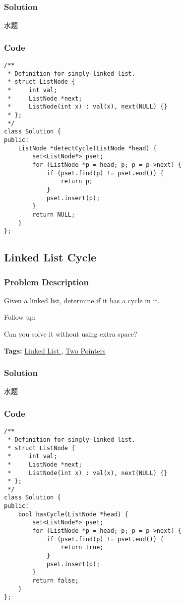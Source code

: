 \documentclass{article}
\begin{document}
\begin{CJK*}{UTF8}{gkai}

\subsubsection*{Solution}
水题

\subsubsection*{Code}
\begin{lstlisting}
/**
 * Definition for singly-linked list.
 * struct ListNode {
 *     int val;
 *     ListNode *next;
 *     ListNode(int x) : val(x), next(NULL) {}
 * };
 */
class Solution {
public:
    ListNode *detectCycle(ListNode *head) {
        set<ListNode*> pset;
        for (ListNode *p = head; p; p = p->next) {
            if (pset.find(p) != pset.end()) {
                return p;
            }
            pset.insert(p);
        }
        return NULL;
    }
}; 
\end{lstlisting}


\subsection{ Linked List Cycle }
\label{ Linked List Cycle }

\subsubsection*{Problem Description}
Given a linked list, determine if it has a cycle in it.

Follow up:


Can you solve it without using extra space?


\textbf{Tags: }
\hyperref[ Linked List ]{ Linked List },  \hyperref[ Two Pointers ]{ Two Pointers }



\subsubsection*{Solution}
水题

\subsubsection*{Code}
\begin{lstlisting}
/**
 * Definition for singly-linked list.
 * struct ListNode {
 *     int val;
 *     ListNode *next;
 *     ListNode(int x) : val(x), next(NULL) {}
 * };
 */
class Solution {
public:
    bool hasCycle(ListNode *head) {
        set<ListNode*> pset;
        for (ListNode *p = head; p; p = p->next) {
            if (pset.find(p) != pset.end()) {
                return true;
            }
            pset.insert(p);
        }
        return false;
    }
}; 
\end{lstlisting}



\end{CJK*}
\end{document}
